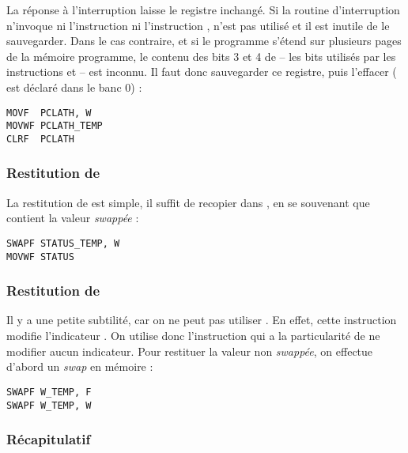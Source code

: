 La réponse à l'interruption laisse le registre  inchangé. Si la routine d'interruption n'invoque ni l'instruction  ni l'instruction ,  n'est pas utilisé et il est inutile de le sauvegarder. Dans le cas contraire, et si le programme s'étend sur plusieurs pages de la mémoire programme, le contenu des bits 3 et 4 de  -- les bits utilisés par les instructions  et  -- est inconnu. Il faut donc sauvegarder ce registre, puis l'effacer ( est déclaré dans le banc 0) :

\begin{lstlisting}[language=assembleur]
MOVF  PCLATH, W
MOVWF PCLATH_TEMP 
CLRF  PCLATH
\end{lstlisting}




\subsubsection{Restitution de }

La restitution de  est simple, il suffit de recopier  dans , en se souvenant que  contient la valeur \emph{swappée} :

\begin{lstlisting}[language=assembleur]
SWAPF STATUS_TEMP, W
MOVWF STATUS
\end{lstlisting}


\subsubsection{Restitution de }

Il y a une petite subtilité, car on ne peut pas utiliser . En effet, cette instruction modifie l'indicateur . On utilise donc l'instruction  qui a la particularité de ne modifier aucun indicateur. Pour restituer la valeur non \emph{swappée}, on effectue d'abord un \emph{swap} en mémoire :

\begin{lstlisting}[language=assembleur]
SWAPF W_TEMP, F
SWAPF W_TEMP, W
\end{lstlisting}





\subsubsection{Récapitulatif}

